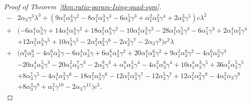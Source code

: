 \documentclass{scrartcl}
\begin{document}
\begin{proof}[Proof of Theorem~\ref{thm:ratio-param-Ising-quad-sym}]
\begin{align}
-&2\alpha_3\gamma^3\lambda^3+(9\alpha_1^2\alpha_3^4\gamma^2-8\alpha_1^2\alpha_3^3\gamma^3-6\alpha_3^5\gamma^3+\alpha_1^2\alpha_3^2\gamma^4+2\alpha_3^3\gamma^5)c\lambda^2\\ \nonumber
+&(-6\alpha_1^4\alpha_3^5\gamma+14\alpha_1^4\alpha_3^4\gamma^2+18\alpha_1^2\alpha_3^6\gamma^2-10\alpha_1^4\alpha_3^3\gamma^3-28\alpha_1^2\alpha_3^5\gamma^3-6\alpha_3^7\gamma^3+2\alpha_1^4\alpha_3^2\gamma^4\\ \nonumber
&+12\alpha_1^2\alpha_3^3\gamma^5+10\alpha_3^5\gamma^5-2\alpha_1^2\alpha_3^2\gamma^6-2\alpha_3^3\gamma^7-2\alpha_3\gamma^9)c^2\lambda\\ \nonumber
+&(\alpha_1^6\alpha_3^6 - 4\alpha_1^6\alpha_3^5\gamma - 6\alpha_1^4\alpha_3^7\gamma + 6\alpha_1^6\alpha_3^4\gamma^2 + 20\alpha_1^4\alpha_3^6\gamma^2 + 9\alpha_1^2\alpha_3^8\gamma^2 - 4\alpha_1^6\alpha_3^3\gamma^3 \\ \nonumber
&- 20\alpha_1^4\alpha_3^5\gamma^3 - 20\alpha_1^2\alpha_3^7\gamma^3 - 2\alpha_3^9\gamma^3 + \alpha_1^6\alpha_3^2\gamma^4 - 4\alpha_1^2\alpha_3^6\gamma^4 + 10\alpha_1^4\alpha_3^3\gamma^5 + 36\alpha_1^2\alpha_3^5\gamma^5\\ \nonumber
& + 8\alpha_3^7\gamma^5 - 4\alpha_1^4\alpha_3^2\gamma^6 - 18\alpha_1^2\alpha_3^4\gamma^6 - 12\alpha_1^2\alpha_3^3\gamma^7 - 12\alpha_3^5\gamma^7 + 12\alpha_1^2\alpha_3^2\gamma^8 - 4\alpha_1^2\alpha_3\gamma^9\\
& + 8\alpha_3^3\gamma^9 + \alpha_1^2\gamma^{10} - 2\alpha_3\gamma^{11})c^3.
\label{eq:master-equation-Ising-quadrangulations-symmetric}
\end{align}


\end{proof}
\end{document}

